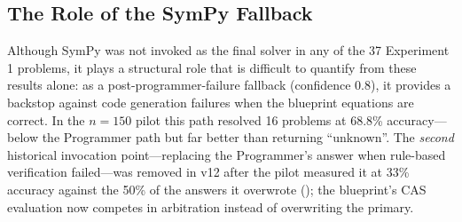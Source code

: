 \documentclass[11pt,a4paper]{article}
\begin{document}
\subsection{The Role of the SymPy Fallback}
Although SymPy was not invoked as the final solver in any of the 37 Experiment 1 problems, it plays a structural role that is difficult to quantify from these results alone: as a post-programmer-failure fallback (confidence 0.8), it provides a backstop against code generation failures when the blueprint equations are correct.
In the $n{=}150$ pilot this path resolved 16 problems at 68.8\% accuracy---below the Programmer path but far better than returning ``unknown''.
The \emph{second} historical invocation point---replacing the Programmer's answer when rule-based verification failed---was removed in v12 after the pilot measured it at 33\% accuracy against the 50\% of the answers it overwrote (); the blueprint's CAS evaluation now competes in arbitration instead of overwriting the primary.
\end{document}
